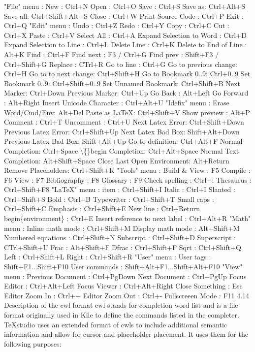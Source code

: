 \documentclass{article}
\begin{document}
	"File" menu :
	New : Ctrl+N
	Open : Ctrl+O
	Save : Ctrl+S
	Save as: Ctrl+Alt+S
	Save all: Ctrl+Shift+Alt+S
	Close : Ctrl+W
	Print Source Code : Ctrl+P
	Exit : Ctrl+Q
	"Edit" menu :
	Undo : Ctrl+Z
	Redo : Ctrl+Y
	Copy : Ctrl+C
	Cut : Ctrl+X
	Paste : Ctrl+V
	Select All : Ctrl+A
	Expand Selection to Word : Ctrl+D
	Expand Selection to Line : Ctrl+L
	Delete Line : Ctrl+K
	Delete to End of Line : Alt+K
	Find : Ctrl+F
	Find next : F3 / Ctrl+G
	Find prev : Shift+F3 / Ctrl+Shift+G
	Replace : CTrl+R
	Go to line : Ctrl+G
	Go to previous change: Ctrl+H
	Go to to next change: Ctrl+Shift+H
	Go to Bookmark 0..9: Ctrl+0..9
	Set Bookmark 0..9: Ctrl+Shift+0..9
	Set Unnamed Bookmark: Ctrl+Shift+B
	Next Marker: Ctrl+Down
	Previous Marker: Ctrl+Up
	Go Back : Alt+Left
	Go Forward : Alt+Right
	Insert Unicode Character : Ctrl+Alt+U
	"Idefix" menu :
	Erase Word/Cmd/Env: Alt+Del
	Paste as LaTeX: Ctrl+Shift+V
	Show preview : Alt+P
	Comment : Ctrl+T
	Uncomment : Ctrl+U
	Next Latex Error: Ctrl+Shift+Down
	Previous Latex Error: Ctrl+Shift+Up
	Next Latex Bad Box: Shift+Alt+Down
	Previous Latex Bad Box: Shift+Alt+Up
	Go to definition: Ctrl+Alt+F
	Normal Completion: Ctrl+Space
	\textbackslash\{\}begin Completion: Ctrl+Alt+Space
	Normal Text Completion: Alt+Shift+Space
	Close Last Open Environment: Alt+Return
	Remove Placeholders: Ctrl+Shift+K
	"Tools" menu :
	Build \& View : F5
	Compile : F6
	View : F7
	Bibliography : F8
	Glossary : F9
	Check spelling : Ctrl+:
	Thesaurus : Ctrl+Shift+F8
	"LaTeX" menu :
	item : Ctrl+Shift+I
	Italic : Ctrl+I
	Slanted : Ctrl+Shift+S
	Bold : Ctrl+B
	Typewriter : Ctrl+Shift+T
	Small caps : Ctrl+Shift+C
	Emphasis : Ctrl+Shift+E
	New line : Ctrl+Return
	begin\{environment\} : Ctrl+E
	Insert reference to next label : Ctrl+Alt+R
	"Math" menu :
	Inline math mode : Ctrl+Shift+M
	Display math mode : Alt+Shift+M
	Numbered equations : Ctrl+Shift+N
	Subscript : Ctrl+Shift+D
	Superscript : CTrl+Shift+U
	Frac : Alt+Shift+F
	Dfrac : Ctrl+Shift+F
	Sqrt : Ctrl+Shift+Q
	Left : Ctrl+Shift+L
	Right : Ctrl+Shift+R
	"User" menu :
	User tags : Shift+F1...Shift+F10
	User commands : Shift+Alt+F1...Shift+Alt+F10
	"View" menu :
	Previous Document : Ctrl+PgDown
	Next Document : Ctrl+PgUp
	Focus Editor : Ctrl+Alt+Left
	Focus Viewer : Ctrl+Alt+Right
	Close Something : Esc
	Editor Zoom In : Ctrl++
	Editor Zoom Out : Ctrl+-
	Fullscreeen Mode : F11
	4.14 Description of the cwl format
	cwl stands for completion word list and is a file format originally used in Kile to define the commands listed in the completer. TeXstudio uses an extended format of cwls to include additional semantic information and allow for cursor and placeholder placement. It uses them for the following purposes:
	
\end{document}
